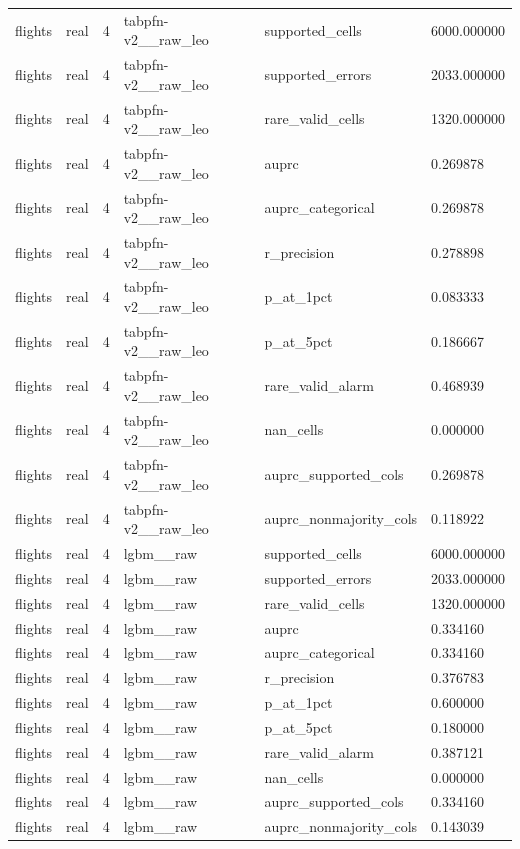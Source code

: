 \begin{tabular}{llllll}
flights & real & 4 & tabpfn-v2\_\_raw\_leo & supported\_cells & 6000.000000 \\
flights & real & 4 & tabpfn-v2\_\_raw\_leo & supported\_errors & 2033.000000 \\
flights & real & 4 & tabpfn-v2\_\_raw\_leo & rare\_valid\_cells & 1320.000000 \\
flights & real & 4 & tabpfn-v2\_\_raw\_leo & auprc & 0.269878 \\
flights & real & 4 & tabpfn-v2\_\_raw\_leo & auprc\_categorical & 0.269878 \\
flights & real & 4 & tabpfn-v2\_\_raw\_leo & r\_precision & 0.278898 \\
flights & real & 4 & tabpfn-v2\_\_raw\_leo & p\_at\_1pct & 0.083333 \\
flights & real & 4 & tabpfn-v2\_\_raw\_leo & p\_at\_5pct & 0.186667 \\
flights & real & 4 & tabpfn-v2\_\_raw\_leo & rare\_valid\_alarm & 0.468939 \\
flights & real & 4 & tabpfn-v2\_\_raw\_leo & nan\_cells & 0.000000 \\
flights & real & 4 & tabpfn-v2\_\_raw\_leo & auprc\_supported\_cols & 0.269878 \\
flights & real & 4 & tabpfn-v2\_\_raw\_leo & auprc\_nonmajority\_cols & 0.118922 \\
flights & real & 4 & lgbm\_\_raw & supported\_cells & 6000.000000 \\
flights & real & 4 & lgbm\_\_raw & supported\_errors & 2033.000000 \\
flights & real & 4 & lgbm\_\_raw & rare\_valid\_cells & 1320.000000 \\
flights & real & 4 & lgbm\_\_raw & auprc & 0.334160 \\
flights & real & 4 & lgbm\_\_raw & auprc\_categorical & 0.334160 \\
flights & real & 4 & lgbm\_\_raw & r\_precision & 0.376783 \\
flights & real & 4 & lgbm\_\_raw & p\_at\_1pct & 0.600000 \\
flights & real & 4 & lgbm\_\_raw & p\_at\_5pct & 0.180000 \\
flights & real & 4 & lgbm\_\_raw & rare\_valid\_alarm & 0.387121 \\
flights & real & 4 & lgbm\_\_raw & nan\_cells & 0.000000 \\
flights & real & 4 & lgbm\_\_raw & auprc\_supported\_cols & 0.334160 \\
flights & real & 4 & lgbm\_\_raw & auprc\_nonmajority\_cols & 0.143039 \\

\end{tabular}
